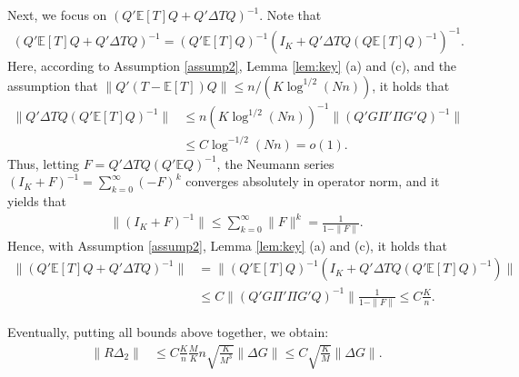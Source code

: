 \documentclass[preprint,11pt]{article}
\newcommand{\mbb}{\mathbb}
\numberwithin{equation}{section}
\begin{document}
Next, we focus on $(Q'\mbb{E}[T]Q+Q'\Delta T Q)^{-1}$. Note that
\begin{align*}
    (Q'\mbb{E}[T]Q+Q'\Delta T Q)^{-1}=(Q'\mbb{E}[T]Q)^{-1}(I_K+Q'\Delta T Q(Q\mbb{E}[T]Q)^{-1})^{-1}.
\end{align*}
Here, according to Assumption \ref{assump2}, Lemma \ref{lem:key} (a) and (c), and the assumption that $\|Q'(T-\mbb{E}[T])Q\|\leq n/(K\log^{1/2}(Nn))$, it holds that 
\begin{align*}
    \|Q'\Delta T Q(Q'\mbb{E}[T]Q)^{-1}\|&\le n(K\log^{1/2}(Nn))^{-1}\|(Q'G\Pi'\Pi G'Q)^{-1}\|\\
    &\le C\log^{-1/2}(Nn)=o(1).
\end{align*}
Thus, letting $F=Q'\Delta T Q(Q'\mbb{E}Q)^{-1}$, the Neumann series $(I_K+F)^{-1}=\sum_{k=0}^\infty(-F)^k$ converges absolutely in operator norm, and it yields that
\begin{align*}
    \|(I_K+F)^{-1}\|\le \sum_{k=0}^\infty\|F\|^k=\frac{1}{1-\|F\|}.
\end{align*}
Hence, with Assumption \ref{assump2}, Lemma \ref{lem:key} (a) and (c), it holds that
\begin{align*}
    \|(Q'\mbb{E}[T]Q+Q'\Delta T Q)^{-1}\|&=\|(Q'\mbb{E}[T]Q)^{-1}(I_K+Q'\Delta T Q(Q'\mbb{E}[T]Q)^{-1})\|\\
    &\le C\|(Q'G\Pi'\Pi G'Q)^{-1}\|\frac{1}{1-\|F\|}\le C\frac{K}{n}.
\end{align*}

Eventually, putting all bounds above together, we obtain:
\begin{align*}
    \|R\Delta_2\|&\le C\frac{K}{n}\frac{M}{K}n\sqrt{\frac{K}{M^3}}\|\Delta G\|\le C\sqrt{\frac{K}{M}}\|\Delta G\|.
\end{align*}
\end{document}
